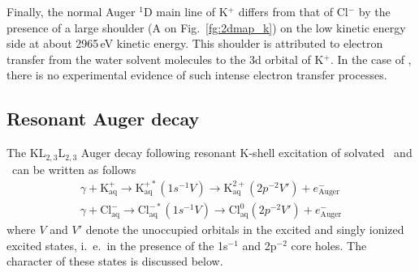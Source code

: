 
Finally, the normal Auger $^1$D main line of K$^{+}$ differs from that of Cl$^{-}$ by the presence of a large shoulder (A on Fig.\ \ref{fg:2dmap_k}) on the low kinetic energy side at about 2965\,eV kinetic energy. This shoulder is attributed to electron transfer from the water solvent molecules \citep{ceolin17:263003} to the 3d orbital of K$^{+}$. In the case of \cli, there is no experimental evidence of such intense electron transfer processes.


\subsection{Resonant Auger decay} \label{ssec:ra}


The KL$_{2,3}$L$_{2,3}$ Auger decay following resonant K-shell excitation of solvated \ki~and \cli~can be written as follows
%
\begin{align*}
\gamma + \text{K}^{+}_{\text{aq}} \rightarrow \text{K}^{+*}_{\text{aq}} (1s^{-1}V) \rightarrow \text{K}^{2+}_{\text{aq}} (2p^{-2}V') + e^{-}_{\text{Auger}}\\
\gamma + \text{Cl}^{-}_{\text{aq}} \rightarrow \text{Cl}^{-*}_{\text{aq}} (1s^{-1}V) \rightarrow \text{Cl}^{0}_{\text{aq}}(2p^{-2}V') + e^{-}_{\text{Auger}}
\end{align*}
%
where $V$ and $V'$ denote the unoccupied orbitals in the excited and singly ionized excited states, i.\ e.\ in the presence of the 1s$^{-1}$ and 2p$^{-2}$ core holes. The character of these states is discussed below.

